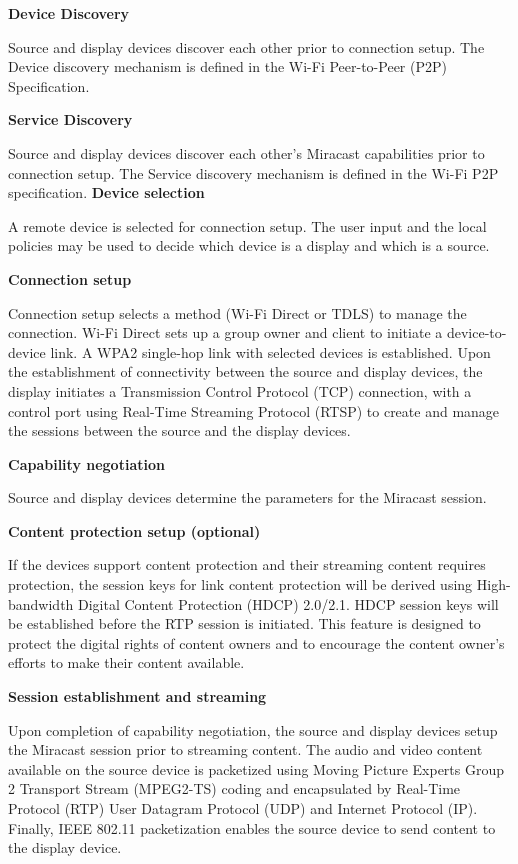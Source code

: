 \textbf{Device Discovery}

Source and display devices discover each other prior to connection setup. The Device discovery mechanism is defined in the Wi-Fi Peer-to-Peer (P2P) Specification.

\textbf{Service Discovery}

Source and display devices discover each other's Miracast capabilities prior to connection setup. The Service discovery mechanism is defined in the Wi-Fi P2P specification.
\clearpage
\textbf{Device selection}

A remote device is selected for connection setup. The user input and the local policies may be used to decide which device is a display and which is a source.

\textbf{Connection setup}

Connection setup selects a method (Wi-Fi Direct or TDLS) to manage the connection. Wi-Fi Direct sets up a group owner and client to initiate a device-to-device link. A WPA2 single-hop link with selected devices is established. Upon the establishment of connectivity between the source and display devices, the display initiates a Transmission Control Protocol (TCP) connection, with a control port using Real-Time Streaming Protocol (RTSP) to create and manage the sessions between the source and the display devices.

\textbf{Capability negotiation} 

Source and display devices determine the parameters for the Miracast session. 

\textbf{Content protection setup (optional)}

If the devices support content protection and their streaming content requires
protection, the session keys for link content protection will be derived using High-bandwidth Digital Content Protection (HDCP) 2.0/2.1. HDCP session keys will be established before the RTP session is initiated. This feature is designed to protect the digital rights of content owners and to encourage the content owner's efforts to make their content available.

\textbf{Session establishment and streaming}

Upon completion of capability negotiation, the source and display devices setup the Miracast session prior to streaming content. The audio and video content available on the source device is packetized 
using Moving Picture Experts Group 2 Transport Stream (MPEG2-TS) coding and encapsulated by Real-Time Protocol (RTP) User Datagram Protocol (UDP) and Internet Protocol (IP). Finally, IEEE 802.11 packetization enables the source device to send content to the display device.


